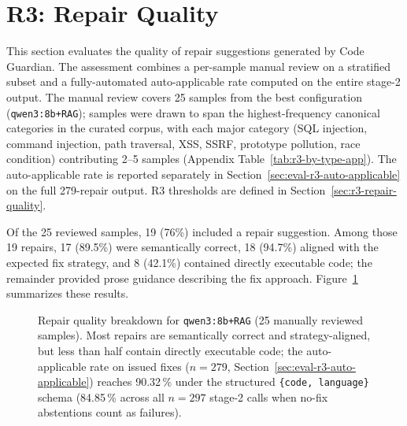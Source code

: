 \section{R3: Repair Quality}
\label{sec:eval-r3}

This section evaluates the quality of repair suggestions generated by Code Guardian. The assessment combines a per-sample manual review on a stratified subset and a fully-automated auto-applicable rate computed on the entire stage-2 output. The manual review covers 25 samples from the best configuration (\texttt{qwen3:8b+RAG}); samples were drawn to span the highest-frequency canonical categories in the curated corpus, with each major category (SQL injection, command injection, path traversal, XSS, SSRF, prototype pollution, race condition) contributing 2--5 samples (Appendix Table~\ref{tab:r3-by-type-app}). The auto-applicable rate is reported separately in Section~\ref{sec:eval-r3-auto-applicable} on the full 279-repair output. R3 thresholds are defined in Section~\ref{sec:r3-repair-quality}.

Of the 25 reviewed samples, 19 (76\%) included a repair suggestion. Among those 19 repairs, 17 (89.5\%) were semantically correct, 18 (94.7\%) aligned with the expected fix strategy, and 8 (42.1\%) contained directly executable code; the remainder provided prose guidance describing the fix approach. Figure~\ref{fig:r3-repair-breakdown} summarizes these results.

\begin{figure}[H]
\centering
{}
\caption[Repair quality breakdown for the headline configuration ($n=25$).]{Repair quality breakdown for \texttt{qwen3:8b+RAG} (25 manually reviewed samples). Most repairs are semantically correct and strategy-aligned, but less than half contain directly executable code; the auto-applicable rate on issued fixes ($n=279$, Section~\ref{sec:eval-r3-auto-applicable}) reaches 90.32\,\% under the structured \texttt{\{code, language\}} schema (84.85\,\% across all $n=297$ stage-2 calls when no-fix abstentions count as failures).}
\label{fig:r3-repair-breakdown}
\end{figure}

